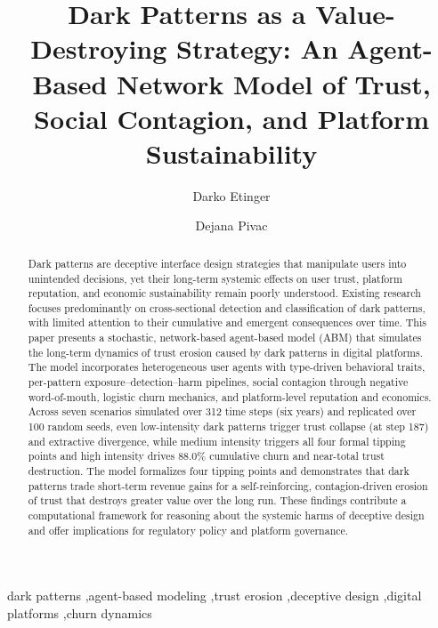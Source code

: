\documentclass[a4paper]{article}
\begin{document}
\title[mode=title]{Dark Patterns as a Value-Destroying Strategy: An Agent-Based Network Model of Trust, Social Contagion, and Platform Sustainability}

\author[1]{Darko Etinger}

\author[1]{Dejana Pivac}



\begin{abstract}
Dark patterns are deceptive interface design strategies that manipulate users into unintended decisions, yet their long-term systemic effects on user trust, platform reputation, and economic sustainability remain poorly understood. Existing research focuses predominantly on cross-sectional detection and classification of dark patterns, with limited attention to their cumulative and emergent consequences over time. This paper presents a stochastic, network-based agent-based model (ABM) that simulates the long-term dynamics of trust erosion caused by dark patterns in digital platforms. The model incorporates heterogeneous user agents with type-driven behavioral traits, per-pattern exposure--detection--harm pipelines, social contagion through negative word-of-mouth, logistic churn mechanics, and platform-level reputation and economics. Across seven scenarios simulated over 312  time steps (six years) and replicated over 100  random seeds, even low-intensity dark patterns trigger trust collapse (at step 187) and extractive divergence, while medium intensity triggers all four formal tipping points and high intensity drives 88.0\%  cumulative churn and near-total trust destruction. The model formalizes four tipping points and demonstrates that dark patterns trade short-term revenue gains for a self-reinforcing, contagion-driven erosion of trust that destroys greater value over the long run. These findings contribute a computational framework for reasoning about the systemic harms of deceptive design and offer implications for regulatory policy and platform governance.
\end{abstract}



\begin{keywords}
dark patterns \sep agent-based modeling \sep trust erosion \sep deceptive design \sep digital platforms \sep churn dynamics
\end{keywords}

\maketitle
\end{document}
